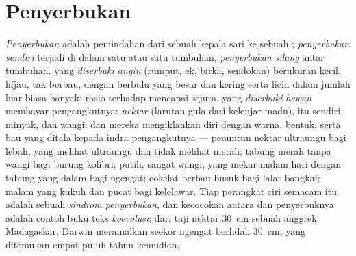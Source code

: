 \section{Penyerbukan}

\begin{definition}\label{def:b2:angiosperm-reproduction:pollination}
\emph{Penyerbukan} adalah pemindahan  dari sebuah kepala
sari ke sebuah ; \emph{penyerbukan sendiri} terjadi di
dalam satu  atau satu tumbuhan, \emph{penyerbukan silang} antar
tumbuhan.  yang \emph{diserbuki angin} (rumput, ek, birka,
sendokan) berukuran kecil, hijau, tak berbau, dengan 
berbulu yang besar dan  kering serta licin dalam jumlah luar
biasa banyak; rasio  terhadap  mencapai
sejuta.  yang \emph{diserbuki hewan} membayar pengangkutnya:
\emph{nektar} (larutan gula dari kelenjar madu),  itu
sendiri, minyak, dan wangi; dan mereka mengiklankan diri dengan warna,
bentuk, serta bau yang ditala kepada indra pengangkutnya --- penuntun
nektar ultraungu bagi lebah, yang melihat ultraungu dan tidak melihat
merah;  tabung merah tanpa wangi bagi burung kolibri; 
putih, sangat wangi, yang mekar malam hari dengan tabung yang dalam
bagi ngengat;  cokelat berbau busuk bagi lalat bangkai; 
malam yang kukuh dan pucat bagi kelelawar. Tiap perangkat ciri semacam
itu adalah sebuah \emph{sindrom penyerbukan}, dan kecocokan antara
 dan penyerbuknya adalah contoh buku teks \emph{koevolusi}: dari
taji nektar \qty{30}{cm} sebuah anggrek Madagaskar, Darwin meramalkan
seekor ngengat berlidah \qty{30}{cm}, yang ditemukan empat puluh tahun
kemudian.
\end{definition}

